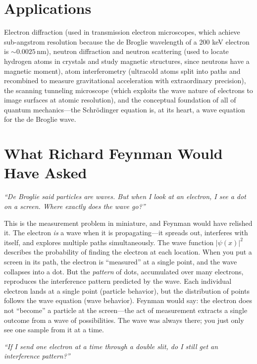 \documentclass[11pt,openright]{book}
\begin{document}
\section*{Applications}

Electron diffraction (used in transmission electron microscopes, which achieve sub-angstrom resolution because the de Broglie wavelength of a 200 keV electron is $\sim 0.0025\,\text{nm}$), neutron diffraction and neutron scattering (used to locate hydrogen atoms in crystals and study magnetic structures, since neutrons have a magnetic moment), atom interferometry (ultracold atoms split into paths and recombined to measure gravitational acceleration with extraordinary precision), the scanning tunneling microscope (which exploits the wave nature of electrons to image surfaces at atomic resolution), and the conceptual foundation of all of quantum mechanics---the Schrödinger equation is, at its heart, a wave equation for the de Broglie wave.
\section*{What Richard Feynman Would Have Asked}

\textit{``De Broglie said particles are waves. But when I look at an electron, I see a dot on a screen. Where exactly does the wave go?''}

This is the measurement problem in miniature, and Feynman would have relished it. The electron \emph{is} a wave when it is propagating---it spreads out, interferes with itself, and explores multiple paths simultaneously. The wave function $|\psi(x)|^2$ describes the probability of finding the electron at each location. When you put a screen in its path, the electron is ``measured'' at a single point, and the wave collapses into a dot. But the \emph{pattern} of dots, accumulated over many electrons, reproduces the interference pattern predicted by the wave. Each individual electron lands at a single point (particle behavior), but the distribution of points follows the wave equation (wave behavior). Feynman would say: the electron does not ``become'' a particle at the screen---the act of measurement extracts a single outcome from a wave of possibilities. The wave was always there; you just only see one sample from it at a time.

\textit{``If I send one electron at a time through a double slit, do I still get an interference pattern?''}
\end{document}
